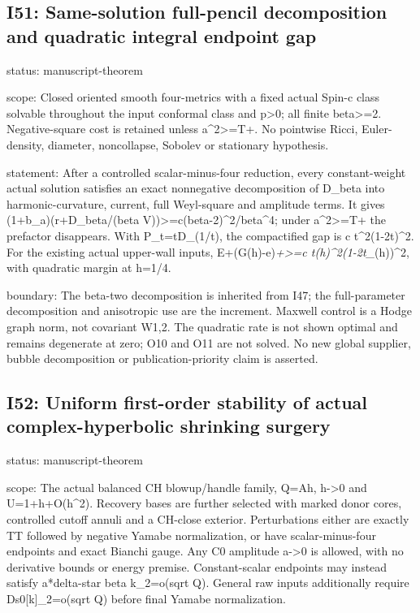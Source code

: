 \documentclass[
  10pt,
]{article}
\begin{document}
\hypertarget{i51-same-solution-full-pencil-decomposition-and-quadratic-integral-endpoint-gap}{%
\subsection{I51: Same-solution full-pencil decomposition and quadratic
integral endpoint
gap}\label{i51-same-solution-full-pencil-decomposition-and-quadratic-integral-endpoint-gap}}

status: manuscript-theorem

scope: Closed oriented smooth four-metrics with a fixed actual Spin-c
class solvable throughout the input conformal class and p\textgreater0;
all finite beta\textgreater=2. Negative-square cost is retained unless
a\^{}2\textgreater=T+. No pointwise Ricci, Euler-density, diameter,
noncollapse, Sobolev or stationary hypothesis.

statement: After a controlled scalar-minus-four reduction, every
constant-weight actual solution satisfies an exact nonnegative
decomposition of D\_beta into harmonic-curvature, current, full
Weyl-square and amplitude terms. It gives (1+b\_a)(r+D\_beta/(beta
V))\textgreater=c(beta-2)\^{}2/beta\^{}4; under a\^{}2\textgreater=T+
the prefactor disappears. With P\_t=tD\_(1/t), the compactified gap is c
t\^{}2(1-2t)\^{}2. For the existing actual upper-wall inputs,
E+(G(h)-e)\emph{+\textgreater=c t(h)\^{}2(1-2t\_}(h))\^{}2, with
quadratic margin at h=1/4.

boundary: The beta-two decomposition is inherited from I47; the
full-parameter decomposition and anisotropic use are the increment.
Maxwell control is a Hodge graph norm, not covariant W1,2. The quadratic
rate is not shown optimal and remains degenerate at zero; O10 and O11
are not solved. No new global supplier, bubble decomposition or
publication-priority claim is asserted.

\hypertarget{i52-uniform-first-order-stability-of-actual-complex-hyperbolic-shrinking-surgery}{%
\subsection{I52: Uniform first-order stability of actual
complex-hyperbolic shrinking
surgery}\label{i52-uniform-first-order-stability-of-actual-complex-hyperbolic-shrinking-surgery}}

status: manuscript-theorem

scope: The actual balanced CH blowup/handle family, Q=Ah,
h-\textgreater0 and U=1+h+O(h\^{}2). Recovery bases are further selected
with marked donor cores, controlled cutoff annuli and a CH-close
exterior. Perturbations either are exactly TT followed by negative
Yamabe normalization, or have scalar-minus-four endpoints and exact
Bianchi gauge. Any C0 amplitude a-\textgreater0 is allowed, with no
derivative bounds or energy premise. Constant-scalar endpoints may
instead satisfy a*\textbar\textbar delta-star beta
k\textbar\textbar\_2=o(sqrt Q). General raw inputs additionally require
\textbar\textbar Ds0{[}k{]}\textbar\textbar\_2=o(sqrt Q) before final
Yamabe normalization.
\end{document}
